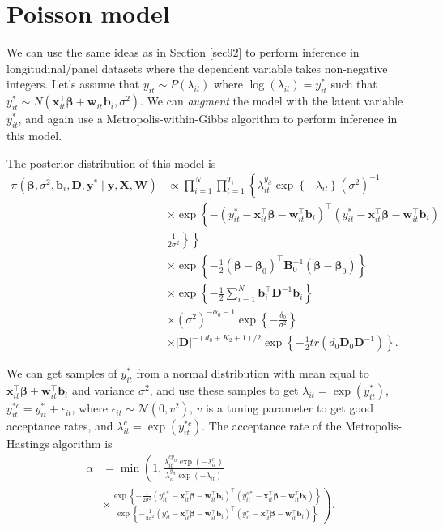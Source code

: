 \section{Poisson model}\label{sec93}

We can use the same ideas as in Section \ref{sec92} to perform inference in longitudinal/panel datasets where the dependent variable takes non-negative integers. Let's assume that $y_{it}\sim P(\lambda_{it})$ where $\log(\lambda_{it})=y_{it}^*$ such that $y_{it}^*\sim N(\bm{x}_{it}^{\top}\bm{\beta}+\bm{w}_{it}^{\top}\bm{b}_i,\sigma^2)$. We can \textit{augment} the model with the latent variable $y_{it}^{*}$, and again use a Metropolis-within-Gibbs algorithm to perform inference in this model.

The posterior distribution of this model is
\begin{align*}
	\pi(\bm{\beta},\sigma^2, \bm{b}_i, \bm{D}, \bm{y}^*\mid \bm{y}, \bm{X}, \bm{W})&\propto \prod_{i=1}^N \prod_{t=1}^{T_i}\left\{\lambda_{it}^{y_{it}}\exp\left\{-\lambda_{it}\right\}(\sigma^2)^{-1}\right.\\
	&\left.\times \exp\left\{-(y_{it}^*-\bm{x}_{it}^{\top}\bm{\beta}-\bm{w}_{it}^{\top}\bm{b}_i)^{\top}(y_{it}^*-\bm{x}_{it}^{\top}\bm{\beta}-\bm{w}_{it}^{\top}\bm{b}_i)\right.\right.\\
	&\left.\left. \frac{1}{2\sigma^2}\right\}\right\}\\
	&\times \exp\left\{-\frac{1}{2}(\bm{\beta}-\bm{\beta}_0)^{\top}\bm{B}_0^{-1}(\bm{\beta}-\bm{\beta}_0)\right\}\\
	&\times \exp\left\{-\frac{1}{2}\sum_{i=1}^N \bm{b}_i^{\top}\bm{D}^{-1}\bm{b}_i\right\}\\
	&\times (\sigma^2)^{-\alpha_0-1}\exp\left\{-\frac{\delta_0}{\sigma^2}\right\}\\
	&\times |\bm{D}|^{-(d_0+K_2+1)/2}\exp\left\{-\frac{1}{2}tr(d_0\bm{D}_0\bm{D}^{-1})\right\}.	
\end{align*}

We can get samples of $y_{it}^*$ from a normal distribution with mean equal to $\bm{x}_{it}^{\top}\bm{\beta}+\bm{w}_{it}^{\top}\bm{b}_i$ and variance $\sigma^2$, and use these samples to get $\lambda_{it}=\exp(y_{it}^*)$, $y_{it}^{*c}=y_{it}^{*}+\epsilon_{it}$, where $\epsilon_{it}\sim\mathcal{N}(0,v^2)$, $v$ is a tuning parameter to get good acceptance rates, and $\lambda_{it}^c=\exp(y_{it}^{*c})$. The acceptance rate of the Metropolis-Hastings algorithm is 
	\begin{align*}
		\alpha&=\min\left(1,\frac{ \lambda_{it}^{cy_{it}}\exp(-\lambda_{it}^c)}{\lambda_{it}^{y_{it}}\exp(-\lambda_{it})}\right.\\
		&\times \left. \frac{\exp\left\{-\frac{1}{2\sigma^2}(y_{it}^{c*}-\bm{x}_{it}^{\top}\bm{\beta}-\bm{w}_{it}^{\top}\bm{b}_i)^{\top}(y_{it}^{c*}-\bm{x}_{it}^{\top}\bm{\beta}-\bm{w}_{it}^{\top}\bm{b}_i)\right\}}{\exp\left\{-\frac{1}{2\sigma^2}(y_{it}^{*}-\bm{x}_{it}^{\top}\bm{\beta}-\bm{w}_{it}^{\top}\bm{b}_i)^{\top}(y_{it}^{*}-\bm{x}_{it}^{\top}\bm{\beta}-\bm{w}_{it}^{\top}\bm{b}_i)\right\}}\right).
	\end{align*}

